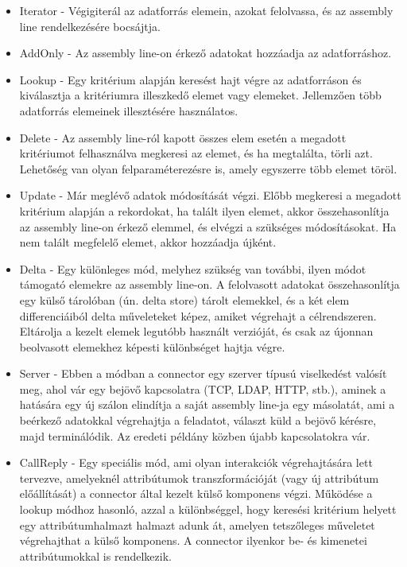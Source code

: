 \begin{itemize}
	\item Iterator - Végigiterál az adatforrás elemein, azokat felolvassa, és az assembly line rendelkezésére bocsájtja.
	
	\item AddOnly - Az assembly line-on érkező adatokat hozzáadja az adatforráshoz.
	
	\item Lookup - Egy kritérium alapján keresést hajt végre az adatforráson és kiválasztja a kritériumra illeszkedő elemet vagy elemeket. Jellemzően több adatforrás elemeinek illesztésére használatos.
	
	\item Delete - Az assembly line-ról kapott összes elem esetén a megadott kritériumot felhasználva megkeresi az elemet, és ha megtalálta, törli azt. Lehetőség van olyan felparaméterezésre is, amely egyszerre több elemet töröl.
	
	\item Update - Már meglévő adatok módosítását végzi. Előbb  megkeresi a megadott kritérium alapján a rekordokat, ha talált ilyen elemet, akkor összehasonlítja az assembly line-on érkező elemmel, és elvégzi a szükséges módosításokat. Ha nem talált megfelelő elemet, akkor hozzáadja újként.
	
	\item Delta - Egy különleges mód, melyhez szükség van további, ilyen módot támogató elemekre az assembly line-on. A felolvasott adatokat összehasonlítja egy külső tárolóban (ún. delta store) tárolt elemekkel, és a két elem differenciáiból delta műveleteket képez, amiket végrehajt a célrendszeren. Eltárolja a kezelt elemek legutóbb használt verzióját, és csak az újonnan beolvasott elemekhez képesti különbséget hajtja végre.
	
	\item Server - Ebben a módban a connector egy szerver típusú viselkedést valósít meg, ahol vár egy bejövő kapcsolatra (TCP, LDAP, HTTP, stb.), aminek a hatására egy új szálon elindítja a saját assembly line-ja egy másolatát, ami a beérkező adatokkal végrehajtja a feladatot, választ küld a bejövő kérésre, majd terminálódik. Az eredeti példány közben újabb kapcsolatokra vár.
	
	\item CallReply - Egy speciális mód, ami olyan interakciók végrehajtására lett tervezve, amelyeknél attribútumok transzformációját (vagy új attribútum előállítását) a connector által kezelt külső komponens végzi. Működése a lookup módhoz hasonló, azzal a különbséggel, hogy keresési kritérium helyett egy attribútumhalmazt halmazt adunk át, amelyen tetszőleges műveletet végrehajthat a külső komponens. A connector ilyenkor be- és kimenetei attribútumokkal is rendelkezik.
\end{itemize}

